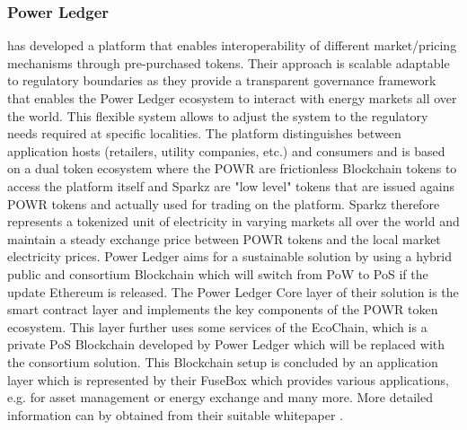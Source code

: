 \documentclass[runningheads]{llncs}
\begin{document}
\subsubsection{Power Ledger} has developed a platform that enables interoperability of different market/pricing mechanisms through pre-purchased tokens. Their approach is scalable adaptable to regulatory boundaries as they provide a transparent governance framework that enables the Power Ledger ecosystem to interact with energy markets all over the world. This flexible system allows to adjust the system to the regulatory needs required at specific localities. The platform distinguishes between application hosts (retailers, utility companies, etc.) and consumers and is based on a dual token ecosystem where the POWR are frictionless Blockchain tokens to access the platform itself and Sparkz are "low level" tokens that are issued agains POWR tokens and actually used for trading on the platform. Sparkz therefore represents a tokenized unit of electricity in varying markets all over the world and maintain a steady exchange price between POWR tokens and the local market electricity prices. \cite{powerledger}
Power Ledger aims for a sustainable solution by using a hybrid public and consortium Blockchain which will switch from PoW to PoS if the update Ethereum is released. The Power Ledger Core layer of their solution is the smart contract layer and implements the key components of the POWR token ecosystem. This layer further uses some services of the EcoChain, which is a private PoS Blockchain developed by Power Ledger which will be replaced with the consortium solution. This Blockchain setup is concluded by an application layer which is represented by their FuseBox which provides various applications, e.g. for asset management or energy exchange and many more. More detailed information can by obtained from their suitable whitepaper \cite{powerledger}.
\end{document}
